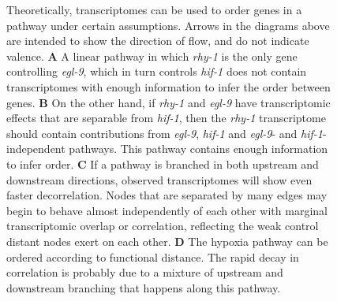 \documentclass[9pt,twocolumn,twoside]{pnas-new}
\newcommand{\egl}{\emph{egl-9}}
\newcommand{\rhy}{\emph{rhy-1}}
\newcommand{\hif}{\emph{hif-1}}
\newcommand{\fog}{\emph{fog-2}}
\begin{document}
\begin{figure}[tbhp]
\caption{
Theoretically, transcriptomes can be used to order genes in a pathway under certain assumptions. Arrows in the diagrams above are intended to show the direction of flow, and do not indicate valence.
\textbf{A} A linear pathway in which \rhy{} is the only gene controlling \egl{}, which in turn controls \hif{} does not contain transcriptomes with enough information to infer the order between genes.
\textbf{B} On the other hand, if \rhy{} and \egl{} have transcriptomic effects that are separable from \hif{}, then the \rhy{} transcriptome should contain contributions from \egl{}, \hif{} and \egl{}- and \hif{}-independent pathways. This pathway contains enough information to infer order.
\textbf{C} If a pathway is branched in both upstream and downstream directions, observed transcriptomes will show even faster decorrelation. Nodes that are separated by many edges may begin to behave almost independently of each other with marginal transcriptomic overlap or correlation, reflecting the weak control distant nodes exert on each other.
\textbf{D} The hypoxia pathway can be ordered according to functional distance. The rapid decay in correlation is probably due to a mixture of upstream and downstream branching that happens along this pathway.
}
\label{fig:decorrelation}
\end{figure}
\end{document}
